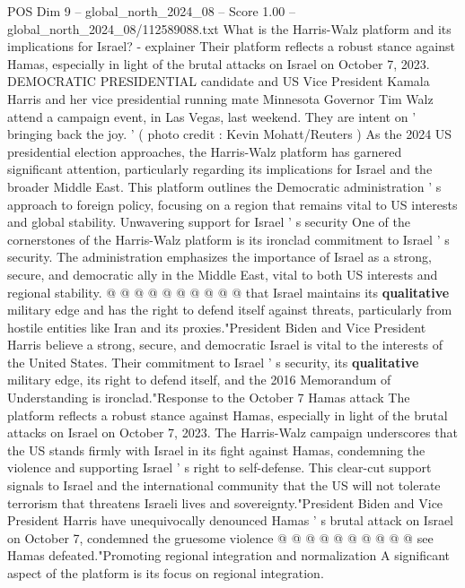 \begin{textsample}{POS Dim 9 – global\_north\_2024\_08 – Score 1.00 – global\_north\_2024\_08/112589088.txt}  \label{ex:f9_pos_200}
What is the Harris-Walz platform and its implications for Israel? - explainer Their platform reflects a robust stance against Hamas, especially in light of the brutal attacks on Israel on October 7, 2023.
DEMOCRATIC PRESIDENTIAL candidate and US Vice President Kamala Harris and her vice presidential running mate Minnesota Governor Tim Walz attend a campaign event, in Las Vegas, last weekend.
They are intent on ' bringing back the joy. ' ( photo credit : Kevin Mohatt/Reuters ) As the 2024 US presidential election approaches, the Harris-Walz platform has garnered significant attention, particularly regarding its implications for Israel and the broader Middle East.
This platform outlines the Democratic administration ' s approach to foreign policy, focusing on a region that remains vital to US interests and global stability.
Unwavering support for Israel ' s security One of the cornerstones of the Harris-Walz platform is its ironclad commitment to Israel ' s security.
The administration emphasizes the importance of Israel as a strong, secure, and democratic ally in the Middle East, vital to both US interests and regional stability. @ @ @ @ @ @ @ @ @ @ that Israel maintains its \textbf{qualitative} military edge and has the right to defend itself against threats, particularly from hostile entities like Iran and its proxies."President Biden and Vice President Harris believe a strong, secure, and democratic Israel is vital to the interests of the United States.
Their commitment to Israel ' s security, its \textbf{qualitative} military edge, its right to defend itself, and the 2016 Memorandum of Understanding is ironclad."Response to the October 7 Hamas attack The platform reflects a robust stance against Hamas, especially in light of the brutal attacks on Israel on October 7, 2023.
The Harris-Walz campaign underscores that the US stands firmly with Israel in its fight against Hamas, condemning the violence and supporting Israel ' s right to self-defense.
This clear-cut support signals to Israel and the international community that the US will not tolerate terrorism that threatens Israeli lives and sovereignty."President Biden and Vice President Harris have unequivocally denounced Hamas ' s brutal attack on Israel on October 7, condemned the gruesome violence @ @ @ @ @ @ @ @ @ @ see Hamas defeated."Promoting regional integration and normalization A significant aspect of the platform is its focus on regional integration.

\end{textsample}
